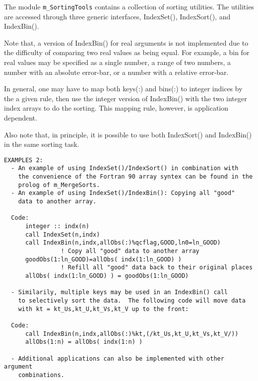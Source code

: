 \noindent
The module {\tt m\_SortingTools} contains a collection of sorting utilities.  
The utilities are accessed through three generic interfaces, IndexSet(),
IndexSort(), and IndexBin().

Note that, a version of IndexBin() for real arguments is not implemented 
due to the difficulty of comparing two real values as being equal.  
For example, a bin for real values may be specified as a single number, 
a range of two numbers, a number with an absolute error-bar, or a number 
with a relative error-bar.
 
In general, one may have to map both keys(:) and bins(:) to integer indices 
by the a given rule, then use the integer version of IndexBin() with the 
two integer index arrays to do the sorting.
This mapping rule, however, is application dependent.
 
Also note that, in principle, it is possible to use both IndexSort() and 
IndexBin() in the same sorting task.
%
\begin{verbatim}
EXAMPLES 2:
  - An example of using IndexSet()/IndexSort() in combination with
    the convenience of the Fortran 90 array syntex can be found in the
    prolog of m_MergeSorts.
  - An example of using IndexSet()/IndexBin(): Copying all "good"
    data to another array.

  Code:
      integer :: indx(n)
      call IndexSet(n,indx)
      call IndexBin(n,indx,allObs(:)%qcflag,GOOD,ln0=ln_GOOD)
                ! Copy all "good" data to another array
      goodObs(1:ln_GOOD)=allObs( indx(1:ln_GOOD) )
                ! Refill all "good" data back to their original places
      allObs( indx(1:ln_GOOD) ) = goodObs(1:ln_GOOD)

  - Similarily, multiple keys may be used in an IndexBin() call
    to selectively sort the data.  The following code will move data
    with kt = kt_Us,kt_U,kt_Vs,kt_V up to the front:

  Code:
      call IndexBin(n,indx,allObs(:)%kt,(/kt_Us,kt_U,kt_Vs,kt_V/))
      allObs(1:n) = allObs( indx(1:n) )

  - Additional applications can also be implemented with other argument 
    combinations.
\end{verbatim} 
%

